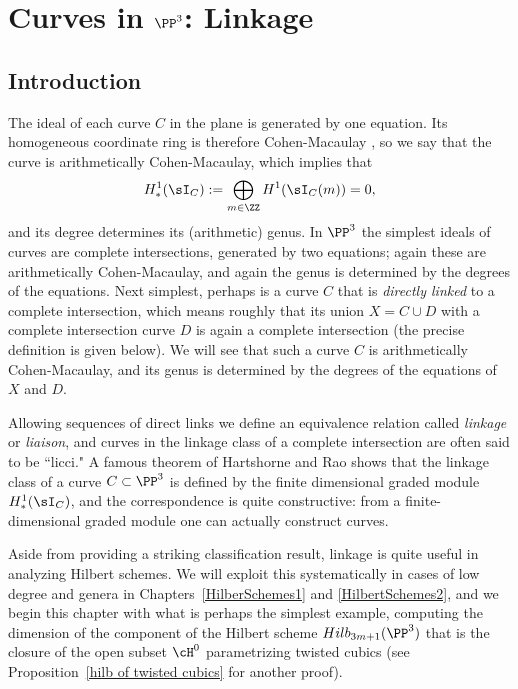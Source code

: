 

\chapter{Curves in $\PP^3$: Linkage}
\label{LiaisonChapter}\label{linkageChapter}\label{LinkageChapter}


\section{Introduction} 
The ideal of each curve $C$ in the plane is generated by one equation. Its homogeneous coordinate ring
is therefore Cohen-Macaulay \cite[****]{Eisenbud1995}, so we say that the curve is arithmetically Cohen-Macaulay, 
which implies that 
$$
H^1_*(\sI_C) := \bigoplus_{m\in \ZZ}H^1(\sI_C(m)) = 0,
$$
 and its degree determines its (arithmetic) genus. In $\PP^3$ the simplest ideals of curves are
complete intersections, generated by two equations; again these are arithmetically Cohen-Macaulay, and again the genus is determined by the degrees of the equations.
 Next simplest, perhaps
is a curve $C$ that is \emph{directly linked} to a complete intersection, which means roughly that its union $X = C\cup D$
with a complete intersection
curve $D$ is again a complete intersection (the precise definition is given below). We will see that such a curve $C$ is arithmetically Cohen-Macaulay,
and its genus is determined by the degrees of the equations of $X$ and $D$.

Allowing sequences of direct links we define an equivalence relation called  \emph{linkage} or \emph{liaison}, 
and curves in the linkage class of a complete intersection are often said to be ``licci." 
A famous theorem of Hartshorne and Rao \cite{MR520926} shows that the linkage class of a curve $C\subset \PP^3$
is defined by the finite dimensional graded module $H^1_*(\sI_C)$,
and the correspondence is quite constructive: from a finite-dimensional graded module one can
actually construct curves.

Aside from providing a striking classification result, linkage is quite useful in analyzing Hilbert schemes. We will exploit this systematically in cases of low degree and genera in Chapters~\ref{HilberSchemes1} and \ref{HilbertSchemes2}, and we begin
this chapter with what is perhaps the simplest example, computing the dimension of the component of
the Hilbert scheme $Hilb_{3m+1}(\PP^3)$ that is the closure of the open subset $\cH^0$  parametrizing twisted cubics (see Proposition~\ref{hilb of twisted cubics} for another proof).

